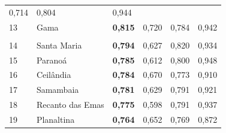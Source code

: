 \begin{table}[c]
\begin{tabular}{llllll}
        {\color[HTML]{202122} 0,714} &
        {\color[HTML]{202122} 0,804} &
        {\color[HTML]{202122} 0,944} \\
        \rowcolor[HTML]{F8F9FA}
        {\color[HTML]{202122} 13} &
        {\color[HTML]{0B0080} Gama} &
        {\color[HTML]{202122} \textbf{0,815}} &
        {\color[HTML]{202122} 0,720} &
        {\color[HTML]{202122} 0,784} &
        {\color[HTML]{202122} 0,942} \\
        \rowcolor[HTML]{EAECF0}
        \cellcolor[HTML]{000074}{\color[HTML]{009900} \textbf{}} &
        \multicolumn{5}{l}{\cellcolor[HTML]{EAECF0}{\color[HTML]{000074} \textbf{IDH-M alto}}} \\
        \rowcolor[HTML]{F8F9FA}
        {\color[HTML]{202122} 14} &
        {\color[HTML]{0B0080} Santa Maria} &
        {\color[HTML]{202122} \textbf{0,794}} &
        {\color[HTML]{202122} 0,627} &
        {\color[HTML]{202122} 0,820} &
        {\color[HTML]{202122} 0,934} \\
        \rowcolor[HTML]{F8F9FA}
        {\color[HTML]{202122} 15} &
        {\color[HTML]{0B0080} Paranoá} &
        {\color[HTML]{202122} \textbf{0,785}} &
        {\color[HTML]{202122} 0,612} &
        {\color[HTML]{202122} 0,800} &
        {\color[HTML]{202122} 0,948} \\
        \rowcolor[HTML]{F8F9FA}
        {\color[HTML]{202122} 16} &
        {\color[HTML]{0B0080} Ceilândia} &
        {\color[HTML]{202122} \textbf{0,784}} &
        {\color[HTML]{202122} 0,670} &
        {\color[HTML]{202122} 0,773} &
        {\color[HTML]{202122} 0,910} \\
        \rowcolor[HTML]{F8F9FA}
        {\color[HTML]{202122} 17} &
        {\color[HTML]{0B0080} Samambaia} &
        {\color[HTML]{202122} \textbf{0,781}} &
        {\color[HTML]{202122} 0,629} &
        {\color[HTML]{202122} 0,791} &
        {\color[HTML]{202122} 0,921} \\
        \rowcolor[HTML]{F8F9FA}
        {\color[HTML]{202122} 18} &
        {\color[HTML]{0B0080} Recanto das Emas} &
        {\color[HTML]{202122} \textbf{0,775}} &
        {\color[HTML]{202122} 0,598} &
        {\color[HTML]{202122} 0,791} &
        {\color[HTML]{202122} 0,937} \\
        \rowcolor[HTML]{F8F9FA}
        {\color[HTML]{202122} 19} &
        {\color[HTML]{0B0080} Planaltina} &
        {\color[HTML]{202122} \textbf{0,764}} &
        {\color[HTML]{202122} 0,652} &
        {\color[HTML]{202122} 0,769} &
        {\color[HTML]{202122} 0,872} \\

\end{tabular}
\end{table}
